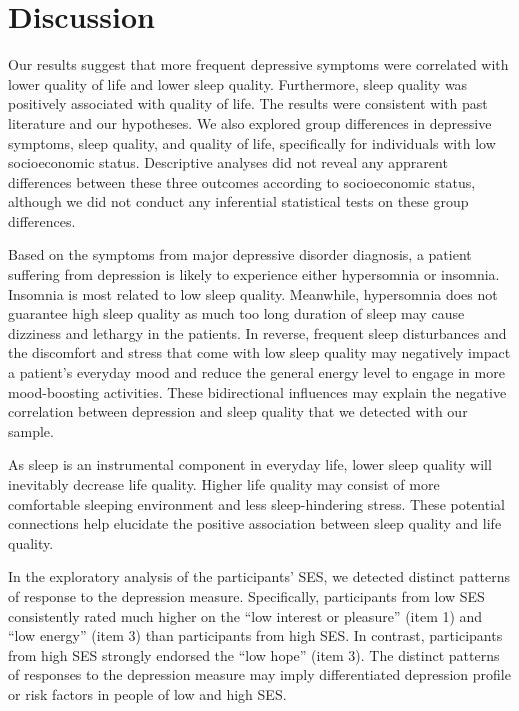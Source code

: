 \documentclass[man, noextraspace]{apa6}
\theoremstyle{definition}
\theoremstyle{definition}
\theoremstyle{definition}
\theoremstyle{remark}
\begin{document}
\section{Discussion}\label{discussion}

Our results suggest that more frequent depressive symptoms were
correlated with lower quality of life and lower sleep quality.
Furthermore, sleep quality was positively associated with quality of
life. The results were consistent with past literature and our
hypotheses. We also explored group differences in depressive symptoms,
sleep quality, and quality of life, specifically for individuals with
low socioeconomic status. Descriptive analyses did not reveal any
apprarent differences between these three outcomes according to
socioeconomic status, although we did not conduct any inferential
statistical tests on these group differences.

Based on the symptoms from major depressive disorder diagnosis, a
patient suffering from depression is likely to experience either
hypersomnia or insomnia. Insomnia is most related to low sleep quality.
Meanwhile, hypersomnia does not guarantee high sleep quality as much too
long duration of sleep may cause dizziness and lethargy in the patients.
In reverse, frequent sleep disturbances and the discomfort and stress
that come with low sleep quality may negatively impact a patient's
everyday mood and reduce the general energy level to engage in more
mood-boosting activities. These bidirectional influences may explain the
negative correlation between depression and sleep quality that we
detected with our sample.

As sleep is an instrumental component in everyday life, lower sleep
quality will inevitably decrease life quality. Higher life quality may
consist of more comfortable sleeping environment and less
sleep-hindering stress. These potential connections help elucidate the
positive association between sleep quality and life quality.

In the exploratory analysis of the participants' SES, we detected
distinct patterns of response to the depression measure. Specifically,
participants from low SES consistently rated much higher on the
\enquote{low interest or pleasure} (item 1) and \enquote{low energy}
(item 3) than participants from high SES. In contrast, participants from
high SES strongly endorsed the \enquote{low hope} (item 3). The distinct
patterns of responses to the depression measure may imply differentiated
depression profile or risk factors in people of low and high SES.
\end{document}
